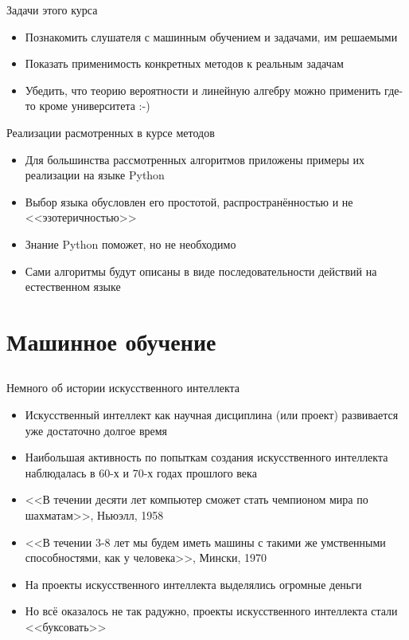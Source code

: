 \documentclass[compress,red,unicode]{beamer}
\begin{document}
\begin{frame}{Задачи этого курса}
\begin{itemize}
	\item Познакомить слушателя с машинным обучением и задачами, им решаемыми
	\item Показать применимость конкретных методов к реальным задачам
	\item Убедить, что теорию вероятности и линейную алгебру можно применить где-то кроме университета :-)
\end{itemize}
\end{frame}

\begin{frame}{Реализации расмотренных в курсе методов}
\begin{itemize}
	\item Для большинства рассмотренных алгоритмов приложены примеры их реализации на языке Python
	\item Выбор языка обусловлен его простотой, распространённостью и не <<эзотеричностью>>
	\item Знание Python поможет, но не необходимо
	\item Сами алгоритмы будут описаны в виде последовательности действий на естественном языке


\end{itemize}
\end{frame}


\section{Машинное обучение}
\subsection{}

\begin{frame}{Немного об истории искусственного интеллекта}
\begin{itemize}
	\item Искусственный интеллект как научная дисциплина (или проект) развивается уже достаточно долгое время
	\item Наибольшая активность по попыткам создания искусственного интеллекта наблюдалась в 60-х и 70-х годах прошлого века
	\item {<<В течении десяти лет компьютер сможет стать чемпионом мира по шахматам>>, Ньюэлл, 1958}
	\item {<<В течении 3-8 лет мы будем иметь машины с такими же умственными способностями, как у человека>>, Мински, 1970}
	\item На проекты искусственного интеллекта выделялись огромные деньги 
	\item Но всё оказалось не так радужно, проекты искусственного интеллекта стали <<буксовать>>
\end{itemize}
\end{frame}
\end{document}
